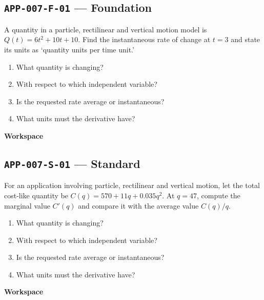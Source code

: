 \documentclass[11pt]{book}
\newcommand{\pid}[1]{\texttt{#1}}
\newcommand{\workspace}{\par\vspace{0.7in}\hrulefill\par\vspace{0.55in}\hrulefill\par}
\begin{document}
\subsection*{\pid{APP-007-F-01} — Foundation}
\begin{problembox}
A quantity in a particle, rectilinear and vertical motion model is $Q(t)=6t^2+10t+10$. Find the instantaneous rate of change at $t=3$ and state its units as ‘quantity units per time unit.’
\end{problembox}
\begin{promptbox}\begin{enumerate}
\item What quantity is changing?
\item With respect to which independent variable?
\item Is the requested rate average or instantaneous?
\item What units must the derivative have?
\end{enumerate}\end{promptbox}
\textbf{Workspace}\workspace
{}
\subsection*{\pid{APP-007-S-01} — Standard}
\begin{problembox}
For an application involving particle, rectilinear and vertical motion, let the total cost-like quantity be $C(q)=570+11q+0.035q^2$. At $q=47$, compute the marginal value $C'(q)$ and compare it with the average value $C(q)/q$.
\end{problembox}
\begin{promptbox}\begin{enumerate}
\item What quantity is changing?
\item With respect to which independent variable?
\item Is the requested rate average or instantaneous?
\item What units must the derivative have?
\end{enumerate}\end{promptbox}
\textbf{Workspace}\workspace
{}
\end{document}

